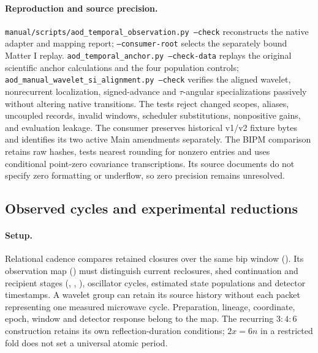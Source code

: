 \paragraph{Reproduction and source precision.}
\texttt{manual/scripts/aod\_temporal\_observation.py --check} reconstructs the native
adapter and mapping report; \texttt{--consumer-root} selects the
separately bound Matter I replay.
\texttt{aod\_temporal\_anchor.py --check-data} replays the original scientific anchor calculations and
the four population controls; \texttt{aod\_manual\_wavelet\_si\_alignment.py --check}
verifies the aligned wavelet, nonrecurrent localization, signed-advance and
\(\tau\)-angular specializations passively without altering native transitions.
The tests reject changed scopes, aliases,
uncoupled records, invalid windows, scheduler substitutions, nonpositive gains,
and evaluation leakage. The consumer preserves historical v1/v2 fixture bytes
and identifies its two active Main amendments separately.
The BIPM comparison retains raw hashes, tests nearest rounding for nonzero
entries and uses conditional point-zero covariance transcriptions.
Its source documents do not specify zero formatting or underflow, so zero
precision remains unresolved.

\subsection{Observed cycles and experimental reductions}
\label{manual:m3-metrology}
\paragraph{Setup.}
Relational cadence compares retained closures over the same bip window
().
Its observation map () must distinguish
current reclosures, shed continuation and recipient stages
(,
,
),
oscillator cycles, estimated state populations and detector timestamps.
A wavelet group can retain its source history without each packet representing
one measured microwave cycle. Preparation, lineage, coordinate, epoch,
window and detector response belong to the map.
The recurring \(3{:}4{:}6\) construction retains its own reflection-duration
conditions; \(2x=6n\) in a restricted fold does not set a universal atomic period.

